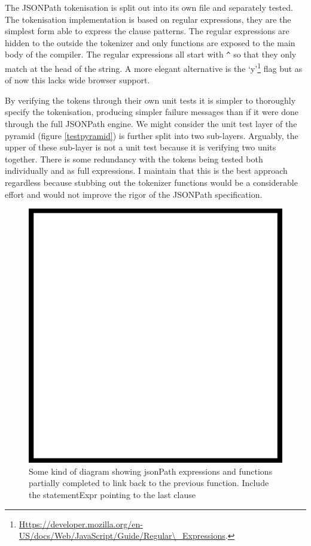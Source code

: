 \documentclass[]{article}
\makeatletter
\def\maxwidth{\ifdim\Gin@nat@width>\linewidth\linewidth
\else\Gin@nat@width\fi}
\let\Oldincludegraphics\includegraphics
\renewcommand{\includegraphics}[1]{\Oldincludegraphics[width=\maxwidth]{#1}}
\makeatother
\begin{document}
The JSONPath tokenisation is split out into its own file and separately
tested. The tokenisation implementation is based on regular expressions,
they are the simplest form able to express the clause patterns. The
regular expressions are hidden to the outside the tokenizer and only
functions are exposed to the main body of the compiler. The regular
expressions all start with \texttt{\^{}} so that they only match at the
head of the string. A more elegant alternative is the `y'\footnote{\href{https://developer.mozilla.org/en-US/docs/Web/JavaScript/Guide/Regular\textbackslash{}_Expressions}{Https://developer.mozilla.org/en-US/docs/Web/JavaScript/Guide/Regular\textbackslash{}\_Expressions}.}
flag but as of now this lacks wide browser support.

By verifying the tokens through their own unit tests it is simpler to
thoroughly specify the tokenisation, producing simpler failure messages
than if it were done through the full JSONPath engine. We might consider
the unit test layer of the pyramid (figure \ref{testpyramid}) is further
split into two sub-layers. Arguably, the upper of these sub-layer is not
a unit test because it is verifying two units together. There is some
redundancy with the tokens being tested both individually and as full
expressions. I maintain that this is the best approach regardless
because stubbing out the tokenizer functions would be a considerable
effort and would not improve the rigor of the JSONPath specification.

\begin{figure}[htbp]
\centering
\includegraphics{images/placeholder.png}
\caption{Some kind of diagram showing jsonPath expressions and functions
partially completed to link back to the previous function. Include the
statementExpr pointing to the last clause}
\end{figure}
\end{document}
